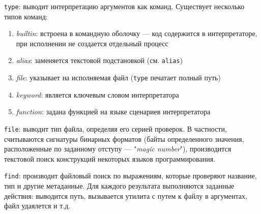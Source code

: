 \documentclass[listings]{labreport}
\begin{document}
\texttt{type}: выводит интерпретацию аргументов как команд. Существует несколько типов команд:

\begin{enumerate}
\item \textit{builtin}: встроена в командную оболочку — код содержится в интерпретаторе, при исполнении не создается отдельный процесс
\item \textit{alias}: заменяется текстовой подстановкой (см. \texttt{alias})
\item \textit{file}: указывает на исполняемая файл (\texttt{type} печатает полный путь)
\item \textit{keyword}: является ключевым словом интерпретатора
\item \textit{function}: задана функцией на языке сценариев интерпретатора
\end{enumerate}

\texttt{file}: выводит тип файла, определяя его серией проверок. В частности, считываются сигнатуры бинарных форматов
(байты определенного значения, расположенные по заданному отступу — "\textit{magic number}"),
производится текстовой поиск конструкций некоторых языков программирования.

\texttt{find}: производит файловый поиск по выражениям, которые проверяют название, тип и другие метаданные.
Для каждого результата выполняются заданные действия: выводится путь, вызывается утилита с путем к файлу в аргументах, файл удаялется и т.д.
\end{document}
